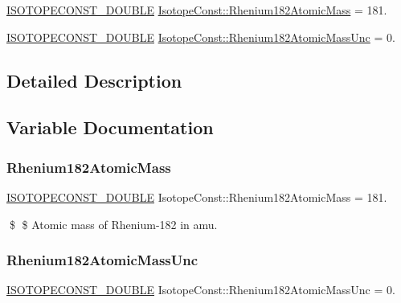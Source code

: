 \begin{DoxyCompactItemize}
\item 
\mbox{\hyperlink{group___isotope_const-_macros_ga8f45a7272ce02c0b4c65c44636ed719a}{I\+S\+O\+T\+O\+P\+E\+C\+O\+N\+S\+T\+\_\+\+D\+O\+U\+B\+LE}} \mbox{\hyperlink{group___isotope_const-_rhenium-_re182_gabdf6505246754e1d423e21c1a7b9776d}{Isotope\+Const\+::\+Rhenium182\+Atomic\+Mass}} = 181.
\item 
\mbox{\hyperlink{group___isotope_const-_macros_ga8f45a7272ce02c0b4c65c44636ed719a}{I\+S\+O\+T\+O\+P\+E\+C\+O\+N\+S\+T\+\_\+\+D\+O\+U\+B\+LE}} \mbox{\hyperlink{group___isotope_const-_rhenium-_re182_ga43dd08f940e508fccc56e650e74375db}{Isotope\+Const\+::\+Rhenium182\+Atomic\+Mass\+Unc}} = 0.
\end{DoxyCompactItemize}


\subsection{Detailed Description}


\subsection{Variable Documentation}
\mbox{\label{group___isotope_const-_rhenium-_re182_gabdf6505246754e1d423e21c1a7b9776d}} 
\subsubsection{\texorpdfstring{Rhenium182\+Atomic\+Mass}{Rhenium182AtomicMass}}
{\footnotesize\ttfamily \mbox{\hyperlink{group___isotope_const-_macros_ga8f45a7272ce02c0b4c65c44636ed719a}{I\+S\+O\+T\+O\+P\+E\+C\+O\+N\+S\+T\+\_\+\+D\+O\+U\+B\+LE}} Isotope\+Const\+::\+Rhenium182\+Atomic\+Mass = 181.}

\$ \$ Atomic mass of Rhenium-\/182 in amu. \mbox{\label{group___isotope_const-_rhenium-_re182_ga43dd08f940e508fccc56e650e74375db}} 
\subsubsection{\texorpdfstring{Rhenium182\+Atomic\+Mass\+Unc}{Rhenium182AtomicMassUnc}}
{\footnotesize\ttfamily \mbox{\hyperlink{group___isotope_const-_macros_ga8f45a7272ce02c0b4c65c44636ed719a}{I\+S\+O\+T\+O\+P\+E\+C\+O\+N\+S\+T\+\_\+\+D\+O\+U\+B\+LE}} Isotope\+Const\+::\+Rhenium182\+Atomic\+Mass\+Unc = 0.}

